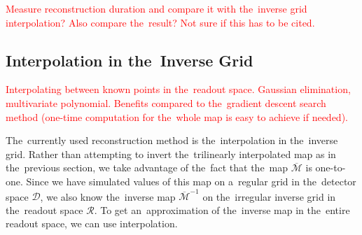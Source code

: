 			\textcolor{red}{Measure reconstruction duration and compare it with the~inverse grid interpolation? Also compare the~result? Not sure if this has to be cited.}
		
		\subsection{Interpolation in the~Inverse Grid}
		\label{sec:interpol}
			\textcolor{red}{Interpolating between known points in the~readout space. Gaussian elimination, multivariate polynomial. Benefits compared to the~gradient descent search method (one-time computation for the~whole map is easy to achieve if needed).}
			
			The~currently used reconstruction method is the~interpolation in the~inverse grid. Rather than attempting to invert the~trilinearly interpolated map as in the~previous section, we take advantage of the~fact that the~map $\overbar{\mathcal{M}}$ is one-to-one. Since we have simulated values of this map on a~regular grid in the~detector space $\mathcal{D}$, we also know the~inverse map $\overbar{\mathcal{M}}^{-1}$ on the~irregular inverse grid in the~readout space $\mathcal{R}$. To get an~approximation of the~inverse map in the~entire readout space, we can use interpolation.
			
